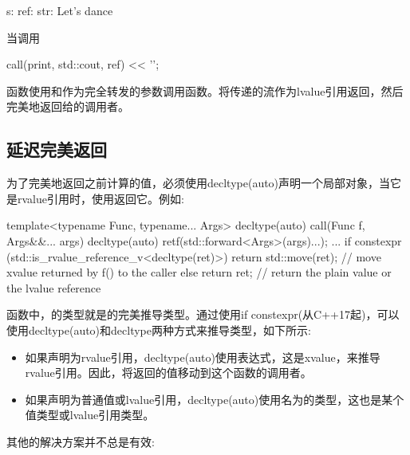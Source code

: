 \begin{outputcode}
s:
ref:
str: Let's dance
\end{outputcode}

当调用

\begin{cppcode}
call(print, std::cout, ref) << '\n';
\end{cppcode}

函数使用和作为完全转发的参数调用函数。将传递的流作为lvalue引用返回，然后完美地返回给的调用者。

\subsection{延迟完美返回}

为了完美地返回之前计算的值，必须使用decltype(auto)声明一个局部对象，当它是rvalue引用时，使用返回它。例如:

\begin{cppcode}
template<typename Func, typename... Args>
decltype(auto) call(Func f, Args&&... args)
{
	decltype(auto) ret{f(std::forward<Args>(args)...)};
	...
	if constexpr (std::is_rvalue_reference_v<decltype(ret)>) {
		return std::move(ret); // move xvalue returned by f() to the caller
	}
	else {
		return ret; // return the plain value or the lvalue reference
	}
}
\end{cppcode}

函数中，的类型就是的完美推导类型。通过使用if constexpr(从C++17起)，可以使用decltype(auto)和decltype两种方式来推导类型，如下所示:

\begin{itemize}
	\item 如果声明为rvalue引用，decltype(auto)使用表达式，这是xvalue，来推导rvalue引用。因此，将返回的值移动到这个函数的调用者。
	\item 如果声明为普通值或lvalue引用，decltype(auto)使用名为的类型，这也是某个值类型或lvalue引用类型。
\end{itemize}

其他的解决方案并不总是有效:

